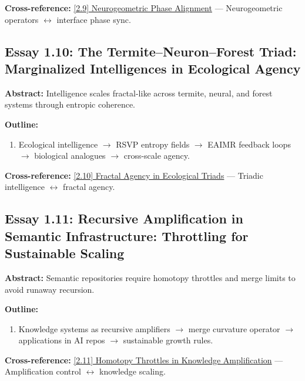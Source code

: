 \documentclass[12pt,a4paper]{article}
\begin{document}
\textbf{Cross-reference:} \hyperref[sec:essay2-9]{[2.9] Neurogeometric Phase Alignment} --- Neurogeometric operators $\leftrightarrow$ interface phase sync.

\subsection{Essay 1.10: The Termite--Neuron--Forest Triad: Marginalized Intelligences in Ecological Agency}
\label{sec:essay1-10}

\textbf{Abstract:} Intelligence scales fractal-like across termite, neural, and forest systems through entropic coherence.

\textbf{Outline:}
\begin{enumerate}
\item Ecological intelligence $\to$ RSVP entropy fields $\to$ EAIMR feedback loops $\to$ biological analogues $\to$ cross-scale agency.
\end{enumerate}

\textbf{Cross-reference:} \hyperref[sec:essay2-10]{[2.10] Fractal Agency in Ecological Triads} --- Triadic intelligence $\leftrightarrow$ fractal agency.

\subsection{Essay 1.11: Recursive Amplification in Semantic Infrastructure: Throttling for Sustainable Scaling}
\label{sec:essay1-11}

\textbf{Abstract:} Semantic repositories require homotopy throttles and merge limits to avoid runaway recursion.

\textbf{Outline:}
\begin{enumerate}
\item Knowledge systems as recursive amplifiers $\to$ merge curvature operator  $\to$ applications in AI repos $\to$ sustainable growth rules.
\end{enumerate}

\textbf{Cross-reference:} \hyperref[sec:essay2-11]{[2.11] Homotopy Throttles in Knowledge Amplification} --- Amplification control $\leftrightarrow$ knowledge scaling.

\end{document}
